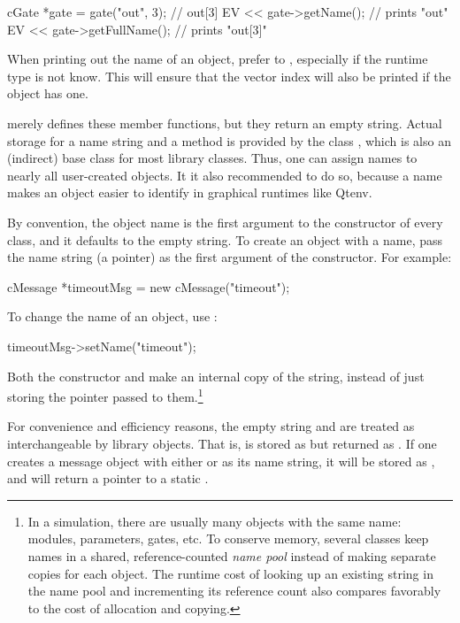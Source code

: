 \begin{cpp}
cGate *gate = gate("out", 3);  // out[3]
EV << gate->getName();  // prints "out"
EV << gate->getFullName();  // prints "out[3]"
\end{cpp}

\begin{note}
When printing out the name of an object, prefer  to
, especially if the runtime type is not know. This will
ensure that the vector index will also be printed if the object has one.
\end{note}

 merely defines these member functions, but they return an
empty string. Actual storage for a name string and a 
method is provided by the class , which is also an
(indirect) base class for most library classes. Thus, one can assign names
to nearly all user-created objects. It it also recommended to do so, because
a name makes an object easier to identify in graphical runtimes like Qtenv.

By convention, the object name is the first argument to the constructor
of every class, and it defaults to the empty string. To create an object with
a name, pass the name string (a  pointer) as the first
argument of the constructor. For example:

\begin{cpp}
cMessage *timeoutMsg = new cMessage("timeout");
\end{cpp}

To change the name of an object, use :

\begin{cpp}
timeoutMsg->setName("timeout");
\end{cpp}

Both the constructor and  make an internal copy of the string,
instead of just storing the pointer passed to them.\footnote{
  In a simulation, there are usually many objects with the same name:
  modules, parameters, gates, etc. To conserve memory, several classes
  keep names in a shared, reference-counted \textit{name pool} instead of
  making separate copies for each object. The runtime cost of looking up an
  existing string in the name pool and incrementing its reference count
  also compares favorably to the cost of allocation and copying.}

For convenience and efficiency reasons, the empty string 
and  are treated as interchangeable by library objects.
That is,  is stored as  but returned as .
If one creates a message object with either 
or  as its name string, it will be stored as ,
and  will return a pointer to a static .


